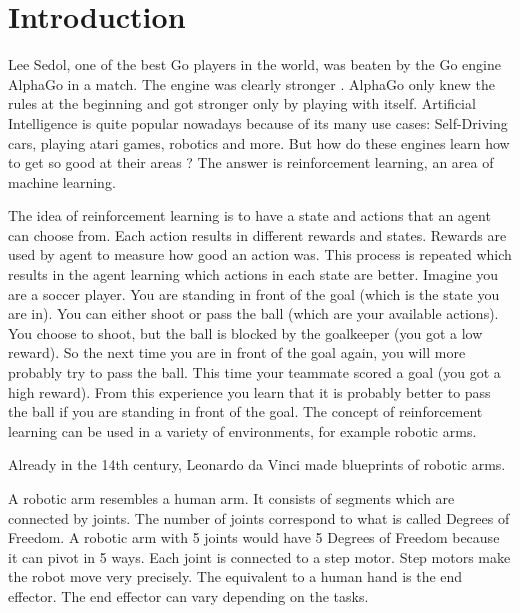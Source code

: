 \chapter{Introduction}



Lee Sedol, one of the best Go players in the world, was beaten by the Go engine AlphaGo in a match. The engine was clearly stronger \cite{leesedol}.  
AlphaGo only knew the rules at the beginning and got stronger only by playing with itself. 
Artificial Intelligence is quite popular nowadays because of its many use cases: Self-Driving cars, playing atari games, robotics and more. 
But how do these engines learn how to get so good at their areas ? The answer is reinforcement learning, an area of machine learning. 

\vspace{0.5cm}

The idea of reinforcement learning is to have a state and actions that an agent can choose from. Each action results in different rewards and states. Rewards are used by agent to measure how good an action was. This process is repeated which results in the agent learning which actions in each state are better.
Imagine you are a soccer player. You are standing in front of the goal (which is the state you are in). You can either shoot or pass the ball (which are your available actions). You choose to shoot, but the ball is blocked by the goalkeeper (you got a low reward). So the next time you are in front of the goal again, you will more probably try to pass the ball. This time your teammate scored a goal (you got a high reward). From this experience you learn that it is probably better to pass the ball if you are standing in front of the goal.
The concept of reinforcement learning can be used in a variety of environments, for example robotic arms.

\vspace{0.5cm}


Already in the 14th century, Leonardo da Vinci made blueprints of robotic arms.

A robotic arm resembles a human arm. It consists of segments which are connected by joints. 
The number of joints correspond to what is called Degrees of Freedom. A robotic arm with 5 joints would have 5 Degrees of Freedom because it can pivot in 5 ways. Each joint is connected to a step motor. Step motors make the robot move very precisely.
The equivalent to a human hand is the end effector. The end effector can vary depending on the tasks.  

